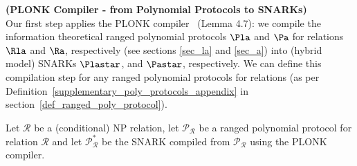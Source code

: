 \noindent \textbf{(PLONK Compiler - from Polynomial Protocols to SNARKs)} \\

\noindent Our first step applies the PLONK compiler~\cite{plonk} (Lemma 4.7): we compile the information theoretical ranged polynomial protocols $\Pla$ and $\Pa$ 
for relations $\Rla$ and $\Ra$, respectively (see sections \ref{sec_la} and \ref{sec_a}) into 
(hybrid model) SNARKs $\Plastar$, and $\Pastar$, respectively. We can define this compilation step 
for any ranged polynomial protocols for relations (as per Definition~\ref{supplementary_poly_protocols_appendix} in section~\ref{def_ranged_poly_protocol}). 
\begin{comment}
In order to do that we need: 
\begin{itemize}
\item  The batched version of KZG polynomial commitments~\cite{KZG_10} described in section 3 of PLONK~\cite{plonk}.\footnote{In fact, 
one can replace the use of KZG polynomial commitments with any binding polynomial commitment that has knowledge-soundness, including non-homomorphic polynomial commitments, 
such as FRI-based polynomial commitments (e.g., RedShift~\cite{redshift}). If the optimisation gained from PLONK linearisation technique is a goal, 
then, with minimal changes one can use any homomorphic polynomial commitment, e.g., the discrete logarithm based polynomial commitment 
from Halo~\cite{halo}.}
\item A general compilation technique: such a technique has been already defined in Lemma 4.7 of PLONK; combined with Lemma 4.5 
from PLONK this technique can be applied with minor adaptations (this includes the corresponding technical measures) to the notion of ranged 
polynomial protocols.  
\item So far, both the ranged polynomial protocols for relations and the protocols resulted after the first compilation step have been explicitly defined as interactive 
protocols. In order to obtain the non-interactive version of the latter (essentially the N in SNARK) one has to apply the Fiat-Shamir 
transform~\cite{FS_transform}, \cite{FS_transform_with_proof}, \cite{SE_plonk}.
\end{itemize}

\end{comment}
\noindent Let $\mathcal{R}$ be a (conditional) NP relation, let $\mathscr{P}_{\mathcal{R}}$ be a ranged polynomial protocol for 
relation $\mathcal{R}$ and let $\mathscr{P}^*_{\mathcal{R}}$ be the SNARK compiled from $\mathscr{P}_{\mathcal{R}}$ using the PLONK compiler.  
